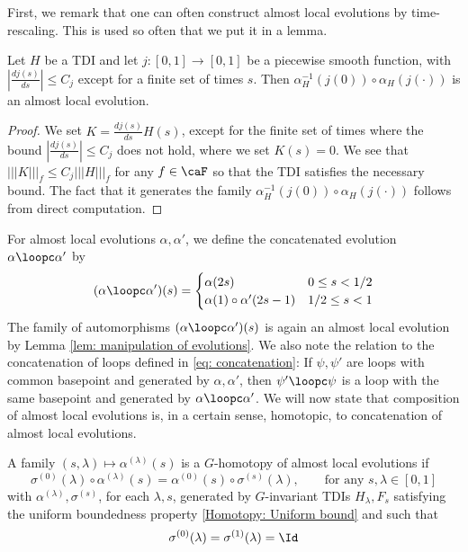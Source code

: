 First, we remark that one can often construct almost local evolutions by time-rescaling. This is used so often that we put it in a lemma.
\begin{lemma}\label{lem: time-rescaling almost local evolutions}
	Let $H$ be a TDI and let $j: [0,1]\to [0,1]$ be a piecewise smooth function, with  $|\frac{dj(s)}{ds}|\leq C_j$ except for a finite set of times $s$. Then $\alpha_H^{-1}(j(0))\circ\alpha_H(j(\cdot))$ is an almost local evolution.
\end{lemma}     
\begin{proof}
	We set $K=\frac{d j(s)}{ds} H(s)$, except for the finite set of times where the bound $|\frac{dj(s)}{ds}|\leq C_j$ does not hold, where we set $K(s)=0$.
	We see that $|||K|||_f\leq C_j |||H|||_f $ for any $f\in \caF$ so that the TDI satisfies the necessary bound. The fact that it generates the family $\alpha^{-1}_H(j(0))\circ\alpha_H(j(\cdot))$  follows from direct computation.      
\end{proof}
For almost local evolutions $\alpha,\alpha'$, we define the concatenated evolution $\alpha\loopc \alpha'$ 
by 
%
\begin{equation}\label{concatenation}
(\alpha\loopc \alpha')(s)= \begin{cases} \alpha(2s) & 0\leq s <1/2 \\
\alpha(1)\circ\alpha'(2s-1)   & 1/2\leq s <1   
\end{cases}
\end{equation}
%
The family of automorphisms $(\alpha\loopc \alpha')(s)$ is again an almost local evolution by Lemma \ref{lem: manipulation of evolutions}.    
We also note the relation to the concatenation of loops defined in \eqref{eq: concatenation}:  If $\psi,\psi'$ are loops with common basepoint and generated by $\alpha,\alpha'$, then $\psi' \loopc \psi$ is a loop with the same basepoint and generated by $\alpha\loopc \alpha'$. 
We will now state that composition of almost local evolutions is, in a certain  sense, homotopic, to concatenation of almost local evolutions.
\begin{definition}\label{def: homo of ale}
	A family $(s,\lambda)\mapsto \alpha^{(\lambda)}(s)$ is a $G$-homotopy of almost local evolutions if 
	$$
	\sigma^{(0)}(\lambda) \circ \alpha^{(\lambda)}(s) 
	=  \alpha^{(0)}(s) \circ \sigma^{(s)}(\lambda)  ,\qquad \text{for any $s,\lambda \in [0,1]$}
	$$  
	with $\alpha^{(\lambda)},\sigma^{(s)}$, for each $\lambda,s$,  generated by $G$-invariant TDIs $H_\lambda, F_s$ satisfying the uniform boundedness property \eqref{Homotopy: Uniform bound} and such that 
	\begin{equation}\label{eq: extra condition homotopy}
	\sigma^{(0)}(\lambda)=\sigma^{(1)}(\lambda)=\Id
	\end{equation}
\end{definition}

